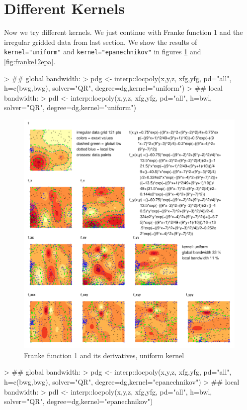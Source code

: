 \documentclass[nojss]{jss}
\def\cmd{\lstinline[basicstyle=\ttfamily,keywordstyle={},breaklines=true,breakatwhitespace=false]}
\begin{document}
\section{Different Kernels}
\label{sec:kernels}
Now we try different kernels. We just continue with Franke function 1 and
the irregular gridded data from last section. We show the results of \cmd{kernel="uniform"} and 
\cmd{kernel="epanechnikov"} in figures \ref{fig:franke12unif} and \ref{fig:franke12epa}.
\begin{Schunk}
\begin{Sinput}
> ## global bandwidth:
> pdg <- interp::locpoly(x,y,z, xfg,yfg, pd="all", h=c(bwg,bwg), solver="QR", degree=dg,kernel="uniform")
> ## local bandwidth:
> pdl <- interp::locpoly(x,y,z, xfg,yfg, pd="all", h=bwl, solver="QR", degree=dg,kernel="uniform")
\end{Sinput}
\end{Schunk}
\begin{figure}[htb]
\centering
\includegraphics{fig--046}
\caption{Franke function 1 and its derivatives, uniform kernel}
\label{fig:franke12unif}
\end{figure}
\begin{Schunk}
\begin{Sinput}
> ## global bandwidth:
> pdg <- interp::locpoly(x,y,z, xfg,yfg, pd="all", h=c(bwg,bwg), solver="QR", degree=dg,kernel="epanechnikov")
> ## local bandwidth:
> pdl <- interp::locpoly(x,y,z, xfg,yfg, pd="all", h=bwl, solver="QR", degree=dg,kernel="epanechnikov")
\end{Sinput}
\end{Schunk}
\end{document}
